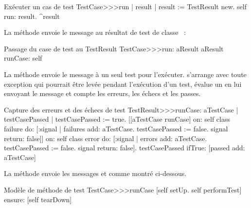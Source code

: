 \documentclass[a4paper,10pt,twoside]{book}
\begin{document}
\begin{method}[tastecaserun]{Exécuter un cas de test}
TestCase>>>run
	| result |
	result := TestResult new.
	self run: result.
	^result
\end{method}


La méthode  envoie le message  au résultat de test de classe ~:

\begin{method}[testcaserun:]{Passage du case de test au TestResult}
TestCase>>>run: aResult
	aResult runCase: self
\end{method}
La méthode  envoie le message  à un seul test pour l'exécuter.
 s'arrange avec toute exception qui pourrait être levée pendant l'exécution d'un test, évalue un  en lui envoyant le message  et compte les erreurs, les échecs et les passes.

\begin{method}[testresultruncase]{Capture des erreurs et des échecs de test}
TestResult>>>runCase: aTestCase
	| testCasePassed |
	testCasePassed := true.
	[[aTestCase runCase] 
			on: self class failure
			do: 
				[:signal | 
				failures add: aTestCase.
				testCasePassed := false.
				signal return: false]]
					on: self class error
					do:
						[:signal |
						errors add: aTestCase.
						testCasePassed := false.
						signal return: false].
	testCasePassed ifTrue: [passed add: aTestCase]
\end{method}

La méthode  envoie les messages
 et  comme montré
ci-dessous.
\begin{method}[testcaseruncase]{Modèle de méthode de test}
TestCase>>>runCase
	[self setUp.
	self performTest] ensure: [self tearDown]
\end{method} %


\end{document}
